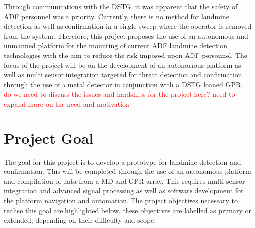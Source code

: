\documentclass[main.tex]{subfiles}
\begin{document}
Through communications with the DSTG, it was apparent that the safety of ADF personnel  was a priority. Currently, there is no method for landmine detection as well as confirmation in a single sweep where the operator is removed from the system. Therefore, this project proposes the use of an autonomous and unmanned platform for the mounting of current ADF landmine detection technologies with the aim to reduce the risk imposed upon ADF personnel. The focus of the project will be on the development of an autonomous platform as well as multi sensor integration targeted for threat detection and confirmation through the use of a metal detector in conjunction with a DSTG loaned GPR.
\\


\textcolor{red}{do we need to discuss the issues and hardships for the project here?}
\textcolor{red}{need to expand more on the need and motivation}
\\\par



\section{Project Goal}

The goal for this project is to develop a prototype for landmine detection and confirmation. This will be completed through the use of an autonomous platform and compilation of data from a MD and GPR array. This requires multi sensor integration and advanced signal processing as well as software development for the platform navigation and automation. The project objectives necessary to realise this goal are highlighted below. these objectives are labelled as primary or extended, depending on their difficulty and scope.
\end{document}

